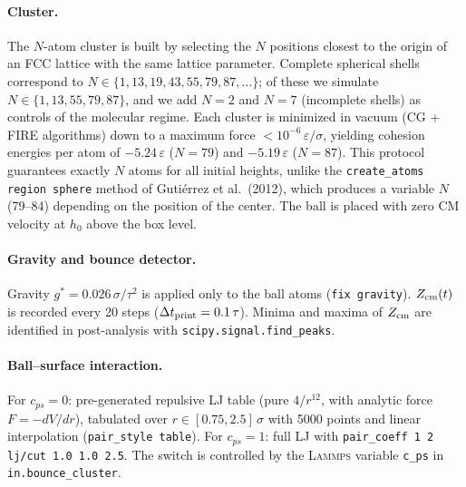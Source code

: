 \documentclass[aps,pre,twocolumn,reprint,superscriptaddress]{revtex4-2}
\newcommand{\eps}{\varepsilon}
\newcommand{\gstar}{g^*}
\newcommand{\lammps}{\textsc{Lammps}}
\begin{document}
\paragraph{Cluster.}
The $N$-atom cluster is built by selecting the $N$ positions closest to the
origin of an FCC lattice with the same lattice parameter. Complete
spherical shells correspond to $N\in\{1,13,19,43,55,79,87,\ldots\}$;
of these we simulate $N\in\{1,13,55,79,87\}$, and we add $N=2$ and $N=7$
(incomplete shells) as controls of the molecular regime.
Each cluster is minimized in vacuum (CG + FIRE algorithms) down to a
maximum force $<10^{-6}\,\eps/\sigma$, yielding cohesion energies per atom
of $-5.24\,\eps$ ($N=79$) and $-5.19\,\eps$ ($N=87$). This protocol
guarantees exactly $N$ atoms for all initial heights, unlike the
\texttt{create\_atoms region sphere} method of Gutiérrez et al.\ (2012),
which produces a variable $N$ (79--84) depending on the position of the
center. The ball is placed with zero CM velocity at $h_0$ above the box
level.

\paragraph{Gravity and bounce detector.}
Gravity $\gstar=0.026\,\sigma/\tau^2$ is applied only to the ball atoms
(\texttt{fix gravity}). $Z_{\rm cm}(t)$ is recorded every 20 steps
($\Delta t_{\rm print}=0.1\,\tau$). Minima and maxima of $Z_{\rm cm}$ are
identified in post-analysis with \texttt{scipy.signal.find\_peaks}.

\paragraph{Ball--surface interaction.}
For $c_{ps}=0$: pre-generated repulsive LJ table (pure $4/r^{12}$, with
analytic force $F=-dV/dr$), tabulated over $r\in[0.75,2.5]\,\sigma$ with
5000 points and linear interpolation (\texttt{pair\_style table}).
For $c_{ps}=1$: full LJ with \texttt{pair\_coeff 1 2 lj/cut 1.0 1.0 2.5}.
The switch is controlled by the \lammps{} variable \texttt{c\_ps} in
\texttt{in.bounce\_cluster}.
\end{document}
